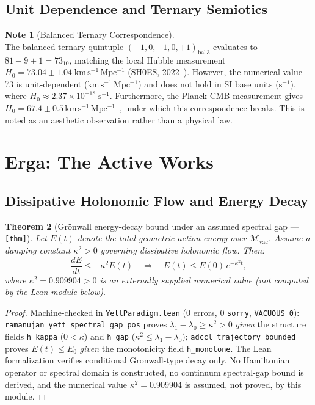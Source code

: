 \documentclass[12pt,letterpaper]{article}
\theoremstyle{plain}
\newtheorem{theorem}{Theorem}[section]
\theoremstyle{definition}
\newtheorem{note}[theorem]{Note}
\begin{document}
\subsection{Unit Dependence and Ternary Semiotics}

\begin{note}[Balanced Ternary Correspondence]\label{note:ternary}
\mbox{}\\
The balanced ternary quintuple $(+1, 0, -1, 0, +1)_{\mathrm{bal}\,3}$ evaluates to $81 - 9 + 1 = 73_{10}$, matching the local Hubble measurement $H_0 = 73.04 \pm 1.04\;\mathrm{km\,s^{-1}\,Mpc^{-1}}$ (SH0ES, 2022~\cite{riess2022}). However, the numerical value 73 is unit-dependent ($\mathrm{km\,s^{-1}\,Mpc^{-1}}$) and does not hold in SI base units ($\mathrm{s^{-1}}$), where $H_0 \approx 2.37 \times 10^{-18}\;\mathrm{s^{-1}}$. Furthermore, the Planck CMB measurement gives $H_0 = 67.4 \pm 0.5\,\mathrm{km\,s^{-1}\,Mpc^{-1}}$~\cite{planck2018}, under which this correspondence breaks. This is noted as an aesthetic observation rather than a physical law.
\end{note}

\section{Erga: The Active Works}
\label{sec:erga}

\subsection{Dissipative Holonomic Flow and Energy Decay}

\begin{theorem}[Gr\"onwall energy-decay bound under an assumed spectral gap --- {\normalfont\texttt{[thm]}}]
\label{thm:adccl}
Let $E(t)$ denote the total geometric action energy over $\mathcal{M}_{\mathrm{vac}}$. Assume a damping constant $\kappa^2>0$ governing dissipative holonomic flow. Then:
\begin{equation}\label{eq:adccl}
  \frac{dE}{dt} \le -\kappa^2 E(t)
  \quad\Longrightarrow\quad
  E(t) \le E(0)\,e^{-\kappa^2 t},
\end{equation}
where $\kappa^2 = 0.909904 > 0$ is an externally supplied numerical value (not computed by the Lean module below).
\end{theorem}

\begin{proof}
Machine-checked in \texttt{YettParadigm.lean} (0 errors, 0 \texttt{sorry}, \texttt{VACUOUS\,0}): \texttt{ramanujan\_yett\_spectral\_gap\_pos} proves $\lambda_1 - \lambda_0 \ge \kappa^2 > 0$ \emph{given} the structure fields \texttt{h\_kappa} ($0 < \kappa$) and \texttt{h\_gap} ($\kappa^2 \le \lambda_1 - \lambda_0$); \texttt{adccl\_trajectory\_bounded} proves $E(t) \le E_0$ \emph{given} the monotonicity field \texttt{h\_monotone}. The Lean formalization verifies conditional Gronwall-type decay only. No Hamiltonian operator or spectral domain is constructed, no continuum spectral-gap bound is derived, and the numerical value $\kappa^2 = 0.909904$ is assumed, not proved, by this module.
\end{proof}
\end{document}
